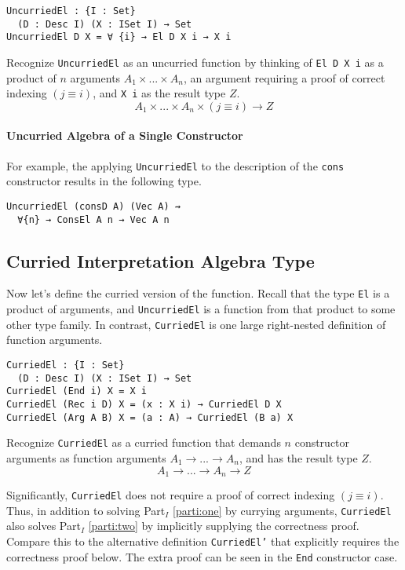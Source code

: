 \documentclass[preprint,nonatbib]{sigplanconf}
\newcommand{\refparti}[1]{Part$_I$ \ref{parti:#1}}
\begin{document}
\begin{verbatim}
UncurriedEl : {I : Set}
  (D : Desc I) (X : ISet I) → Set
UncurriedEl D X = ∀ {i} → El D X i → X i
\end{verbatim}

Recognize {\tt UncurriedEl} as an uncurried function by thinking of
{\tt El D X i} as a product of $n$ arguments $A_1 × ... × A_n$, an
argument requiring a proof of correct indexing $(j≡i)$, and
{\tt X i} as the result type $Z$.
\[
A_1 × ... × A_n × (j ≡ i) → Z
\]

\paragraph{Uncurried Algebra of a Single Constructor}

For example, the applying {\tt UncurriedEl} to the description of the
{\tt cons} constructor results in the following type.

\begin{verbatim}
UncurriedEl (consD A) (Vec A) ⇝
  ∀{n} → ConsEl A n → Vec A n
\end{verbatim}

\subsection{Curried Interpretation Algebra Type}

Now let's define the curried version of the function. Recall that the
type {\tt El} is a product of arguments, and {\tt UncurriedEl} is a
function from that product to some other type family. In contrast,
{\tt CurriedEl} is one large right-nested definition of function
arguments.

\begin{verbatim}
CurriedEl : {I : Set}
  (D : Desc I) (X : ISet I) → Set
CurriedEl (End i) X = X i
CurriedEl (Rec i D) X = (x : X i) → CurriedEl D X
CurriedEl (Arg A B) X = (a : A) → CurriedEl (B a) X
\end{verbatim}

Recognize {\tt CurriedEl} as a curried function that demands
$n$ constructor arguments as function arguments
$A_1 → ... → A_n$, and has the result type $Z$.
\[
A_1 → ... → A_n → Z
\]

Significantly, {\tt CurriedEl} does not require a proof of correct
indexing $(j≡i)$. Thus, in addition to solving \refparti{one} by
currying arguments, {\tt CurriedEl} also solves \refparti{two} by
implicitly supplying the correctness proof. Compare this to the
alternative definition {\tt CurriedEl'} that explicitly requires the
correctness proof below. The extra proof can be seen in the
{\tt End} constructor case.
\end{document}
